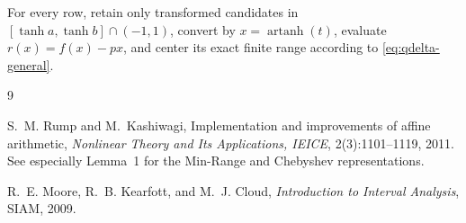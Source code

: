 \documentclass[11pt]{article}
\newcommand{\artanh}{\operatorname{artanh}}
\begin{document}
For every row, retain only transformed candidates in \([\tanh a,\tanh b]\cap(-1,1)\), convert by \(x=\artanh(t)\), evaluate \(r(x)=f(x)-px\), and center its exact finite range according to \eqref{eq:qdelta-general}.

\begin{thebibliography}{9}

S.~M. Rump and M.~Kashiwagi,
\newblock Implementation and improvements of affine arithmetic,
\newblock \emph{Nonlinear Theory and Its Applications, IEICE}, 2(3):1101--1119, 2011.
\newblock See especially Lemma~1 for the Min-Range and Chebyshev representations.

R.~E. Moore, R.~B. Kearfott, and M.~J. Cloud,
\newblock \emph{Introduction to Interval Analysis},
\newblock SIAM, 2009.

\end{thebibliography}
\end{document}
